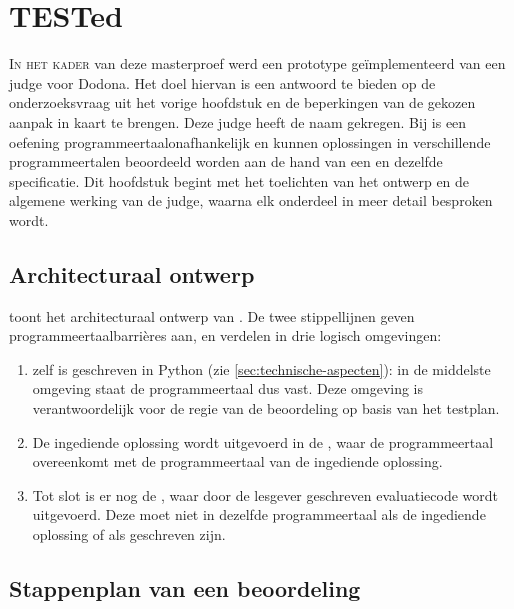 \chapter{TESTed}\label{ch:tested}

\lettrine{I}{n het kader} van deze masterproef werd een prototype geïmplementeerd van een judge voor Dodona.
Het doel hiervan is een antwoord te bieden op de onderzoeksvraag uit het vorige hoofdstuk en de beperkingen van de gekozen aanpak in kaart te brengen.
Deze judge heeft de naam \tested{} gekregen.
Bij \tested{} is een oefening programmeertaalonafhankelijk en kunnen oplossingen in verschillende programmeertalen beoordeeld worden aan de hand van een en dezelfde specificatie.
Dit hoofdstuk begint met het toelichten van het ontwerp en de algemene werking van de judge, waarna elk onderdeel in meer detail besproken wordt.

\section{Architecturaal ontwerp}\label{sec:architecturaal-overzicht}

 toont het architecturaal ontwerp van \tested{}.
De twee stippellijnen geven programmeertaalbarrières aan, en verdelen \tested{} in drie logisch omgevingen:

\begin{enumerate}
    \item \tested{} zelf is geschreven in Python (zie \cref{sec:technische-aspecten}): in de middelste omgeving staat de programmeertaal dus vast.
    Deze omgeving is verantwoordelijk voor de regie van de beoordeling op basis van het testplan.
    \item De ingediende oplossing wordt uitgevoerd in de , waar de programmeertaal overeenkomt met de programmeertaal van de ingediende oplossing.
    \item Tot slot is er nog de , waar door de lesgever geschreven evaluatiecode wordt uitgevoerd.
    Deze moet niet in dezelfde programmeertaal als de ingediende oplossing of als \tested{} geschreven zijn.
\end{enumerate}

\section{Stappenplan van een beoordeling}\label{sec:stappenplan-van-een-beoordeling}

